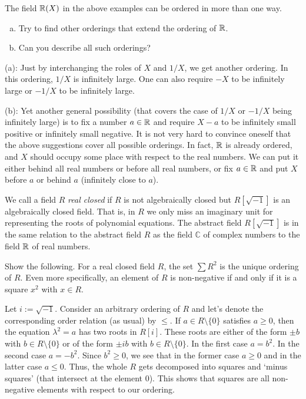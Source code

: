 \begin{exercise}
	\label{exer:all:orderings:rational:functions}
	The field $\mathbb{R}(X)$ in the above examples can be ordered in more than one way. 
	\begin{enumerate}[(a)]
		\item Try to find other orderings that extend the ordering of $\mathbb{R}$. 
		\item Can you describe all such orderings? 
	\end{enumerate}
\end{exercise}
\begin{solution}
	(a): Just by interchanging the roles of $X$ and $1/X$, we get another ordering. In this ordering, $1/X$ is infinitely large. One can also require $-X$ to be infinitely large or $-1/X$ to be infinitely large. 
	
	(b): Yet another general possibility (that covers the case of $1/X$ or $-1/X$ being infinitely large) is to fix a number $a \in \mathbb{R}$ and require $X-a$ to be infinitely small positive or infinitely small negative. It is not very hard to convince oneself that the above suggestions cover all possible orderings. In fact, $\mathbb{R}$ is already ordered, and $X$ should occupy some place with respect to the real numbers. We can put it either behind all real numbers or before all real numbers, or fix $a \in \mathbb{R}$ and put $X$ before $a$ or behind $a$ (infinitely close to $a$). 
\end{solution}

We call a field $R$ \emph{real closed} if $R$ is not algebraically closed but $R[\sqrt{-1}]$ is an algebraically closed field. That is, in $R$ we only miss an imaginary unit for representing the roots of polynomial equations. The abstract field $R[\sqrt{-1}]$ is in the same relation to the abstract field $R$ as the field $\mathbb{C}$ of complex numbers to the field $\mathbb{R}$ of real numbers. 

\begin{exercise}
Show the following. For a real closed field $R$, the set  $\sum R^2$ is the unique ordering of $R$. Even more specifically, an element of $R$ is non-negative if and only if it is a square $x^2$ with $x \in R$. 
\end{exercise}
\begin{solution}
	Let $i:= \sqrt{-1}$. Consider an arbitrary ordering of $R$ and let's denote the corresponding order relation (as usual) by $\le$. If $a \in R \setminus \{0\}$ satisfies $a \ge 0$,
	then the equation $\lambda^2 = a$ has two roots in $R[i]$. These roots are either of the form $\pm b$ with $b \in R \setminus \{0\}$ or of the form $\pm i b$ with $b \in R \setminus \{0\}$. In the first case $a = b^2$. In the second case $a = - b^2$. Since $b^2 \ge 0$, we see that in the former case $a \ge 0$ and in the latter case $a \le 0$. Thus, the whole $R$ gets decomposed into squares and `minus squares' (that intersect at the element $0$). This shows that squares are all non-negative elements with respect to our ordering. 
\end{solution}

